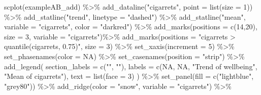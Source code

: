\documentclass[
  letterpaper,
  DIV=11,
  numbers=noendperiod]{scrreprt}
\newenvironment{Shaded}{\begin{snugshade}}{\end{snugshade}}
\newcommand{\AttributeTok}[1]{\textcolor[rgb]{0.40,0.45,0.13}{#1}}
\newcommand{\ConstantTok}[1]{\textcolor[rgb]{0.56,0.35,0.01}{#1}}
\newcommand{\DecValTok}[1]{\textcolor[rgb]{0.68,0.00,0.00}{#1}}
\newcommand{\FunctionTok}[1]{\textcolor[rgb]{0.28,0.35,0.67}{#1}}
\newcommand{\NormalTok}[1]{\textcolor[rgb]{0.00,0.23,0.31}{#1}}
\newcommand{\SpecialCharTok}[1]{\textcolor[rgb]{0.37,0.37,0.37}{#1}}
\newcommand{\StringTok}[1]{\textcolor[rgb]{0.13,0.47,0.30}{#1}}
\begin{document}
\begin{Shaded}
\begin{Highlighting}[]
\FunctionTok{scplot}\NormalTok{(exampleAB\_add) }\SpecialCharTok{\%\textgreater{}\%}
  \FunctionTok{add\_dataline}\NormalTok{(}\StringTok{"cigarrets"}\NormalTok{, }\AttributeTok{point =} \FunctionTok{list}\NormalTok{(}\AttributeTok{size =} \DecValTok{1}\NormalTok{)) }\SpecialCharTok{\%\textgreater{}\%}
  \FunctionTok{add\_statline}\NormalTok{(}\StringTok{"trend"}\NormalTok{, }\AttributeTok{linetype =} \StringTok{"dashed"}\NormalTok{) }\SpecialCharTok{\%\textgreater{}\%}
  \FunctionTok{add\_statline}\NormalTok{(}\StringTok{"mean"}\NormalTok{, }\AttributeTok{variable =} \StringTok{"cigarrets"}\NormalTok{, }\AttributeTok{color =} \StringTok{"darkred"}\NormalTok{) }\SpecialCharTok{\%\textgreater{}\%}
  \FunctionTok{add\_marks}\NormalTok{(}\AttributeTok{positions =} \FunctionTok{c}\NormalTok{(}\DecValTok{14}\NormalTok{,}\DecValTok{20}\NormalTok{), }\AttributeTok{size =} \DecValTok{3}\NormalTok{, }\AttributeTok{variable =} \StringTok{"cigarrets"}\NormalTok{)}\SpecialCharTok{\%\textgreater{}\%}
  \FunctionTok{add\_marks}\NormalTok{(}\AttributeTok{positions =} \StringTok{"cigarrets \textgreater{} quantile(cigarrets, 0.75)"}\NormalTok{, }\AttributeTok{size =} \DecValTok{3}\NormalTok{) }\SpecialCharTok{\%\textgreater{}\%}
  \FunctionTok{set\_xaxis}\NormalTok{(}\AttributeTok{increment =} \DecValTok{5}\NormalTok{) }\SpecialCharTok{\%\textgreater{}\%}
  \FunctionTok{set\_phasenames}\NormalTok{(}\AttributeTok{color =} \ConstantTok{NA}\NormalTok{) }\SpecialCharTok{\%\textgreater{}\%}
  \FunctionTok{set\_casenames}\NormalTok{(}\AttributeTok{position =} \StringTok{"strip"}\NormalTok{) }\SpecialCharTok{\%\textgreater{}\%}
  \FunctionTok{add\_legend}\NormalTok{(}
    \AttributeTok{section\_labels =} \FunctionTok{c}\NormalTok{(}\StringTok{""}\NormalTok{, }\StringTok{""}\NormalTok{),}
    \AttributeTok{labels =} \FunctionTok{c}\NormalTok{(}\ConstantTok{NA}\NormalTok{, }\ConstantTok{NA}\NormalTok{, }\StringTok{"Trend of wellbeing"}\NormalTok{, }\StringTok{"Mean of cigarrets"}\NormalTok{),}
    \AttributeTok{text =} \FunctionTok{list}\NormalTok{(}\AttributeTok{face =} \DecValTok{3}\NormalTok{)}
\NormalTok{  ) }\SpecialCharTok{\%\textgreater{}\%}
  \FunctionTok{set\_panel}\NormalTok{(}\AttributeTok{fill =} \FunctionTok{c}\NormalTok{(}\StringTok{"lightblue"}\NormalTok{, }\StringTok{"grey80"}\NormalTok{)) }\SpecialCharTok{\%\textgreater{}\%}
  \FunctionTok{add\_ridge}\NormalTok{(}\AttributeTok{color =} \StringTok{"snow"}\NormalTok{, }\AttributeTok{variable =} \StringTok{"cigarrets"}\NormalTok{) }\SpecialCharTok{\%\textgreater{}\%}

\end{Highlighting}
\end{Shaded}
\end{document}
